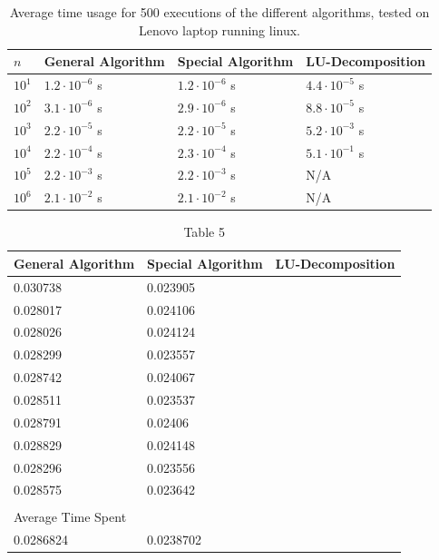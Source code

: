 \documentclass[a4paper,10pt]{article}
\begin{document}
\begin{table}[]
\begin{tabular}{llll}
\hline
\hline
$n$ &General Algorithm  & Special Algorithm & LU-Decomposition \\
\hline
$10^1$ & $1.2\cdot 10^{-6}$ s & $1.2\cdot 10^{-6}$ s & $4.4\cdot 10^{-5}$ s\\
$10^2$ & $3.1\cdot 10^{-6}$ s & $2.9\cdot 10^{-6}$ s & $8.8\cdot 10^{-5}$ s\\
$10^3$ & $2.2\cdot 10^{-5}$ s & $2.2\cdot 10^{-5}$ s & $5.2\cdot 10^{-3}$ s\\
$10^4$ & $2.2\cdot 10^{-4}$ s & $2.3\cdot 10^{-4}$ s & $5.1\cdot 10^{-1}$ s\\
$10^5$ & $2.2\cdot 10^{-3}$ s & $2.2\cdot 10^{-3}$ s & N/A               \\
$10^6$ & $2.1\cdot 10^{-2}$ s & $2.1\cdot 10^{-2}$ s & N/A
\end{tabular}
\caption{Average time usage for 500 executions of the different algorithms, tested on Lenovo laptop running linux.}
\label{tab:LUres}
\end{table}


\begin{table}[h]
\begin{tabular}{lll}
\hline
General Algorithm  & Special Algorithm & LU-Decomposition \\
\hline
0.030738           & 0.023905          &                  \\
0.028017           & 0.024106          &                  \\
0.028026           & 0.024124          &                  \\
0.028299           & 0.023557          &                  \\
0.028742           & 0.024067          &                  \\
0.028511           & 0.023537          &                  \\
0.028791           & 0.02406           &                  \\
0.028829           & 0.024148          &                  \\
0.028296           & 0.023556          &                  \\
0.028575           & 0.023642          &                  \\
                   &                   &                  \\\hline
Average Time Spent &                   &                  \\
\hline
0.0286824          & 0.0238702         &                 
\end{tabular}
\label{fig:5}
\caption{Table 5}
\end{table}
\end{document}
